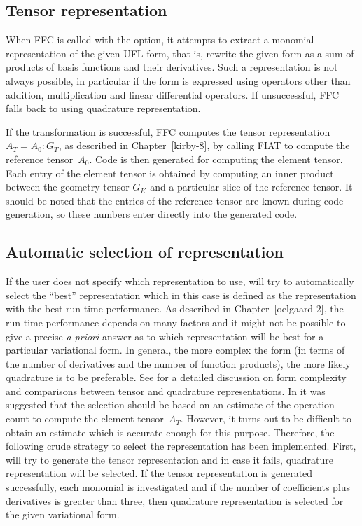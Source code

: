 \subsection{Tensor representation}

When FFC is called with the  option,
it attempts to extract a monomial representation of the given UFL
form, that is, rewrite the given form as a sum of products of basis
functions and their derivatives. Such a representation is not always
possible, in particular if the form is expressed using operators other
than addition, multiplication and linear differential operators. If
unsuccessful, FFC falls back to using quadrature representation.

If the transformation is successful, FFC computes the tensor
representation $A_T = A_0 : G_T$, as described in Chapter~[kirby-8],
by calling FIAT to compute the reference tensor~$A_0$. Code is then
generated for computing the element tensor. Each entry of the element
tensor is obtained by computing an inner product between the geometry
tensor $G_K$ and a particular slice of the reference tensor. It should
be noted that the entries of the reference tensor are known during
code generation, so these numbers enter directly into the generated
code.

\subsection{Automatic selection of representation}

If the user does not specify which representation to use, \ffc{} will
try to automatically select the ``best'' representation which in this
case is defined as the representation with the best run-time
performance. As described in Chapter~[oelgaard-2], the run-time
performance depends on many factors and it might not be possible to
give a precise \emph{a priori} answer as to which representation will
be best for a particular variational form. In general, the more
complex the form (in terms of the number of derivatives and the number
of function products), the more likely quadrature is to be
preferable. See \cite{oelgaard:2010} for a detailed discussion on form
complexity and comparisons between tensor and quadrature
representations. In \cite{oelgaard:2010} it was suggested that the
selection should be based on an estimate of the operation count to
compute the element tensor~$A_T$.  However, it turns out to be
difficult to obtain an estimate which is accurate enough for this
purpose. Therefore, the following crude strategy to select the
representation has been implemented. First, \ffc{} will try to
generate the tensor representation and in case it fails, quadrature
representation will be selected. If the tensor representation is
generated successfully, each monomial is investigated and if the
number of coefficients plus derivatives is greater than three, then
quadrature representation is selected for the given variational form.

